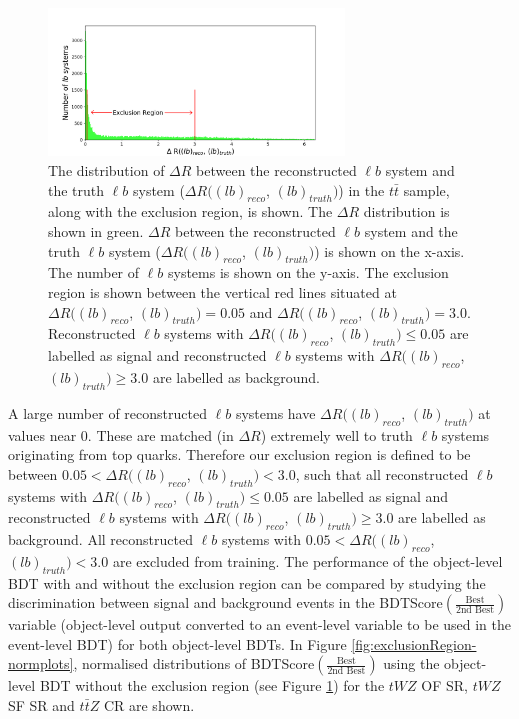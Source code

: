 \begin{figure}[h!]
    \centering
    \includegraphics[width=0.7\textwidth]{figures/DeltaR_lb_bdt.png}
    \caption{The distribution of $\Delta R$ between the reconstructed $\ell b$ system and the truth $\ell b$ system ($\Delta R((lb)_{reco}$, $(lb)_{truth})$) in the $t\bar{t}$ sample, along with the exclusion region, is shown. The $\Delta R$ distribution is shown in green. $\Delta R$ between the reconstructed $\ell b$ system and the truth $\ell b$ system ($\Delta R((lb)_{reco}$, $(lb)_{truth})$) is shown on the x-axis. The number of $\ell b$ systems is shown on the y-axis. The exclusion region is shown between the vertical red lines situated at $\Delta R((lb)_{reco}$, $(lb)_{truth}) = 0.05$ and $\Delta R((lb)_{reco}$, $(lb)_{truth})=3.0$. Reconstructed $\ell b$ systems with $\Delta R((lb)_{reco}$, $(lb)_{truth}) \leq 0.05$ are labelled as signal and reconstructed $\ell b$ systems with $\Delta R((lb)_{reco}$, $(lb)_{truth}) \geq 3.0$ are labelled as background. }
    \label{fig:exclusionRegion}
\end{figure}A large number of reconstructed $\ell b$ systems have $\Delta R((lb)_{reco}$, $(lb)_{truth})$ at values near $0$. These are matched (in $\Delta R$) extremely well to truth $\ell b$ systems originating from top quarks. Therefore our exclusion region is defined to be between $0.05 < \Delta R((lb)_{reco}$, $(lb)_{truth}) < 3.0$, such that all reconstructed $\ell b$ systems with $\Delta R((lb)_{reco}$, $(lb)_{truth}) \leq 0.05$ are labelled as signal and reconstructed $\ell b$ systems with $\Delta R((lb)_{reco}$, $(lb)_{truth}) \geq 3.0$ are labelled as background. All reconstructed $\ell b$ systems with $0.05 < \Delta R((lb)_{reco}$, $(lb)_{truth}) < 3.0$ are excluded from training. The performance of the object-level BDT with and without the exclusion region can be compared by studying the discrimination between signal and background events in the BDTScore$(\frac{\text{Best}}{\text{2nd Best}})$ variable (object-level output converted to an event-level variable to be used in the event-level BDT) for both object-level BDTs. In Figure \ref{fig:exclusionRegion-normplots}, normalised distributions of BDTScore$(\frac{\text{Best}}{\text{2nd Best}})$ using the object-level BDT without the exclusion region (see Figure \ref{fig:exclusionRegion}) for the $tWZ$ OF SR, $tWZ$ SF SR and $t\bar{t}Z$ CR are shown.
